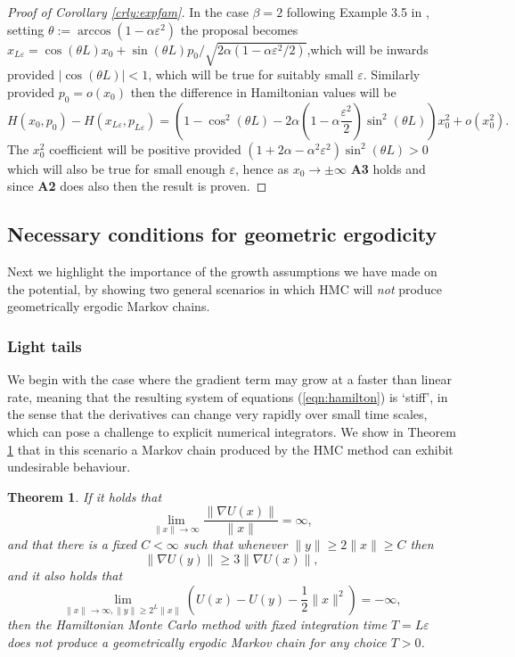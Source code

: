 \documentclass[bj,numbers,noshowframe]{imsart}
\newcommand{\e}{\varepsilon}
\theoremstyle{definition}
\theoremstyle{plain}
\newtheorem{thm}[defn]{Theorem}
\theoremstyle{definition}
\begin{document}
\begin{proof}[Proof of Corollary \ref{crly:expfam}]
In the case $\beta=2$ following Example 3.5 in \cite{beskos2013optimal},
setting $\theta:=\arccos(1-\alpha\varepsilon^{2})$ the proposal becomes
$x_{L\varepsilon}=\cos(\theta L)x_{0}+\sin(\theta L)p_{0}/\sqrt{2\alpha(1-\alpha\varepsilon^{2}/2)}$,which
will be inwards provided $|\cos(\theta L)|<1$, which will be true
for suitably small $\varepsilon$. Similarly provided $p_{0}=o(x_{0})$
then the difference in Hamiltonian values will be
\[
H(x_{0},p_{0})-H(x_{L\varepsilon},p_{L\varepsilon})=\left(1-\cos^{2}(\theta L)-2\alpha\left(1-\alpha\frac{\varepsilon^{2}}{2}\right)\sin^{2}(\theta L)\right)x_{0}^{2}+o(x_{0}^{2}).
\]
The $x_{0}^{2}$ coefficient will be positive provided $(1+2\alpha-\alpha^{2}\varepsilon^{2})\sin^{2}(\theta L)>0$
which will also be true for small enough $\varepsilon$, hence as
$x_{0}\to\pm\infty$ \textbf{A3} holds and since \textbf{A2} does
also then the result is proven.
\end{proof}

\subsection{Necessary conditions for geometric ergodicity}

Next we highlight the importance of the growth assumptions we have made on the potential, by showing two general scenarios in which HMC will \emph{not} produce geometrically ergodic Markov chains.

\subsubsection{Light tails}
We begin with the case where the gradient term may grow at a faster than linear rate, meaning that the resulting system of equations (\ref{eqn:hamilton}) is `stiff', in the sense that the derivatives can change very rapidly over small time scales, which can pose a challenge to explicit numerical integrators.  We show in Theorem \ref{thm:light} that in this scenario a Markov chain produced by the HMC method can exhibit undesirable behaviour.

\begin{thm} \label{thm:light}
If it holds that
\begin{equation} \label{eqn:explode}
\lim_{\|x\| \to \infty}\frac{\|\nabla U(x)\|}{\|x\|} = \infty,
\end{equation}
and that there is a fixed $C <\infty$ such that whenever $\|y\|\geq 2\|x\|\geq C$ then
\begin{equation} \label{eqn:oscillations}
\|\nabla U(y)\| \geq 3\|\nabla U(x)\|,
\end{equation} 
and it also holds that
\begin{equation} \label{eqn:oscillation2}
\lim_{\|x\|\to\infty, \|y\| \geq 2^L\|x\|} \left( U(x) - U(y) - \frac{1}{2}\|x\|^2 \right) = -\infty,
\end{equation}
then the Hamiltonian Monte Carlo method with fixed integration time $T = L\e$ does not produce a geometrically ergodic Markov chain for any choice $T>0$.
\end{thm}
\end{document}
